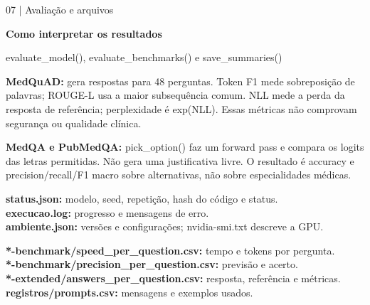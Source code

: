 \documentclass[10pt,a4paper]{article}
\newcommand{\blocktitle}[1]{\par\vspace{3pt}{\large\bfseries\color{teal}#1}\par}
\begin{document}
\newpage
\begin{tcolorbox}[colback=navy,colframe=navy,arc=2mm,boxrule=0pt,left=4mm,right=4mm,top=4mm,bottom=4mm]
{\color{white}\small 07 | Avaliação e arquivos\par\medskip\fontsize{23}{27}\selectfont\bfseries Como interpretar os resultados\par\medskip\normalfont\small evaluate\_model(), evaluate\_benchmarks() e save\_summaries()}\end{tcolorbox}
\begin{center}\end{center}
\textbf{MedQuAD:} gera respostas para 48 perguntas. Token F1 mede sobreposição de palavras; ROUGE-L usa a maior subsequência comum. NLL mede a perda da resposta de referência; perplexidade é exp(NLL). Essas métricas não comprovam segurança ou qualidade clínica.

\textbf{MedQA e PubMedQA:} pick\_option() faz um forward pass e compara os logits das letras permitidas. Não gera uma justificativa livre. O resultado é accuracy e precision/recall/F1 macro sobre alternativas, não sobre especialidades médicas.

\blocktitle{Arquivos que vale abrir primeiro}
\textbf{status.json:} modelo, seed, repetição, hash do código e status.\\ \textbf{execucao.log:} progresso e mensagens de erro.\\ \textbf{ambiente.json:} versões e configurações; nvidia-smi.txt descreve a GPU.

\textbf{*-benchmark/speed\_per\_question.csv:} tempo e tokens por pergunta.\\ \textbf{*-benchmark/precision\_per\_question.csv:} previsão e acerto.\\ \textbf{*-extended/answers\_per\_question.csv:} resposta, referência e métricas.\\ \textbf{registros/prompts.csv:} mensagens e exemplos usados.
\end{document}
